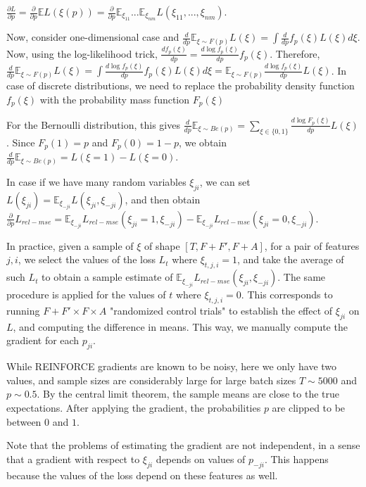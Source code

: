 \documentclass[a4paper,11pt,oneside]{report}
\begin{document}
$\frac{\partial L}{\partial p}=\frac{\partial}{\partial p}\mathbb{E} L(\xi(p))=\frac{\partial}{\partial p}\mathbb E_{\xi_{11}}...\mathbb E_{\xi_{nm}}L(\xi_{11},...,\xi_{nm})$.

Now, consider one-dimensional case and $\frac{d}{dp}\mathbb E_{\xi\sim F(p)}L(\xi)=\int \frac{d}{dp}f_p(\xi)L(\xi)d\xi$. Now, using the log-likelihood trick, $\frac{df_p(\xi)}{dp}=\frac{d\log f_p(\xi)}{dp}f_p(\xi)$. Therefore, $\frac{d}{dp}\mathbb E_{\xi\sim F(p)}L(\xi)=\int\frac{d\log f_p(\xi)}{dp}f_p(\xi)L(\xi)d\xi=\mathbb E_{\xi\sim F(p)}\frac{d\log f_p(\xi)}{dp}L(\xi)$. In case of discrete distributions, we need to replace the probability density function $f_p(\xi)$ with the probability mass function $F_p(\xi)$

For the Bernoulli distribution, this gives $\frac{d}{dp}\mathbb E_{\xi\sim Be(p)}=\sum_{\xi\in\{0, 1\}}\frac{d\log F_p(\xi)}{dp}L(\xi)$. Since $F_p(1)=p$ and $F_p(0)=1-p$, we obtain $\frac{d}{dp}\mathbb E_{\xi\sim Be(p)}=L(\xi=1)-L(\xi=0)$.

In case if we have many random variables $\xi_{ji}$, we can set $L(\xi_{ji})=\mathbb E_{\xi_{-ji}}L(\xi_{ji}, \xi_{-ji})$, and then obtain $\frac{\partial }{\partial p}L_{rel-mse}=\mathbb E_{\xi_{-ji}}L_{rel-mse}(\xi_{ji}=1, \xi_{-ji})-\mathbb E_{\xi_{-ji}}L_{rel-mse}(\xi_{ji}=0, \xi_{-ji})$.

In practice, given a sample of $\xi$ of shape $[T, F+F', F+A]$, for a pair of features $j, i$, we select the values of the loss $L_{t}$ where $\xi_{t, j, i}=1$, and take the average of such $L_t$ to obtain a sample estimate of $\mathbb E_{\xi_{-ji}}L_{rel-mse}(\xi_{ji}, \xi_{-ji})$. The same procedure is applied for the values of $t$ where $\xi_{t, j, i}=0$. This corresponds to running $F+F'\times F\times A$ "randomized control trials" to establish the effect of $\xi_{ji}$ on $L$, and computing the difference in means. This way, we manually compute the gradient for each $p_{ji}$.

While REINFORCE gradients are known to be noisy, here we only have two values, and sample sizes are considerably large for large batch sizes $T\sim 5000$ and $p\sim 0.5$. By the central limit theorem, the sample means are close to the true expectations. After applying the gradient, the probabilities $p$ are clipped to be between $0$ and $1$.

Note that the problems of estimating the gradient are not independent, in a sense that a gradient with respect to $\xi_{ji}$ depends on values of $p_{-ji}$. This happens because the values of the loss depend on these features as well.
\end{document}
